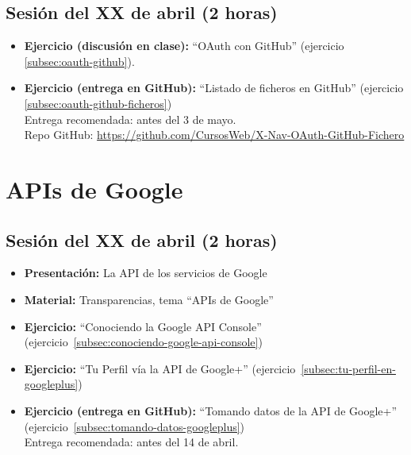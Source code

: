 \documentclass[a4paper,12pt]{report}
\begin{document}
\subsection{Sesión del XX de abril (2 horas)}

\begin{itemize}
\item \textbf{Ejercicio (discusión en clase):} ``OAuth con GitHub'' (ejercicio \ref{subsec:oauth-github}).
\item \textbf{Ejercicio (entrega en GitHub):} ``Listado de ficheros en GitHub'' (ejercicio \ref{subsec:oauth-github-ficheros})  \\
  Entrega recomendada: antes del 3 de mayo. \\
  Repo GitHub: \url{https://github.com/CursosWeb/X-Nav-OAuth-GitHub-Fichero}
\end{itemize}


\section{APIs de Google}

\subsection{Sesión del XX de abril (2 horas)}

\begin{itemize}
 \item \textbf{Presentación:} La API de los servicios de Google
 \item \textbf{Material:} Transparencias, tema ``APIs de Google''
 \item \textbf{Ejercicio:} ``Conociendo la Google API Console'' (ejercicio~\ref{subsec:conociendo-google-api-console})
  \item \textbf{Ejercicio:} ``Tu Perfil vía la API de Google+'' (ejercicio~\ref{subsec:tu-perfil-en-googleplus})
 \item \textbf{Ejercicio (entrega en GitHub):} ``Tomando datos de la API de Google+'' (ejercicio~\ref{subsec:tomando-datos-googleplus}) 
 \\
Entrega recomendada: antes del 14 de abril.
\end{itemize}
\end{document}
